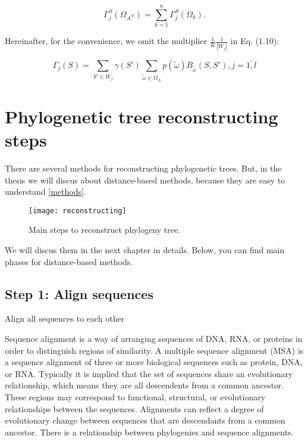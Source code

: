 \begin{equation*}
\Gamma_j^S(\Omega_{A^N}) = \sum_{k=1}^n \Gamma_j^S(\Omega_k). 
\end{equation*}

Hereinafter, for the convenience, we omit the multiplier 
$\frac{1}{K}\frac{1}{|W_j|}$ in Eq. (1.10):

\begin{equation}
\Gamma_j(S) = \sum_{S' \in W_j} \gamma(S') \sum_{\tilde{\omega} \in \Omega_A} p(\tilde{\omega}) B_{\tilde{\omega}}(S,S'), j = \bar{1,l}
\end{equation}

\section{Phylogenetic tree reconstructing steps}
There are several methods for reconstructing phylogenetic trees.
But, in the thesis we will discus about distance-based methods, 
because they are easy to understand \ref{methods}.

\begin{figure}[!htb] 
  \center
  \texttt{[image: reconstructing]}
  \caption[w]{Main steps to reconstruct phylogeny tree.} 
  \label{img:rec1}  
\end{figure}

We will discus them in the next chapter in details. 
Below, you can find main phases for distance-based methods.

\subsection{Step 1: Align sequences} \label{phase1}

\begin{algorithm}[H]
{
	Align all sequences to each other\;
}
\end{algorithm}

\cite{rporter}
Sequence alignment is a way of arranging sequences of DNA, RNA, or 
proteins in order to distinguish regions of similarity. A multiple sequence 
alignment (MSA) is a sequence alignment of three or more biological sequences 
such as protein, DNA, or RNA. Typically it is implied that the set of sequences 
share an evolutionary relationship, which means they are all descendents from a 
common ancestor. These regions may correspond to functional, structural, or 
evolutionary relationships between the sequences. Alignments can reflect a degree 
of evolutionary change between sequences that are descendants from a common 
ancestor. There is a relationship between phylogenies and sequence alignments.

